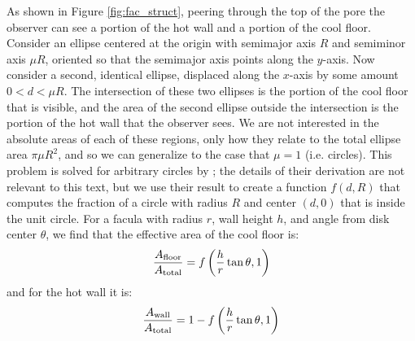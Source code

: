 \documentclass[linenumbers,5p,twocolumn,authoryear]{elsarticle}
\begin{document}
As shown in Figure \ref{fig:fac_struct}, peering through the top of the pore the observer can see a portion of the hot wall and a portion of the cool floor. Consider an ellipse centered at the origin with semimajor axis $R$ and semiminor axis $\mu R$, oriented so that the semimajor axis points along the $y$-axis. Now consider a second, identical ellipse, displaced along the $x$-axis by some amount $0<d<\mu R$. The intersection of these two ellipses is the portion of the cool floor that is visible, and the area of the second ellipse outside the intersection is the portion of the hot wall that the observer sees. We are not interested in the absolute areas of each of these regions, only how they relate to the total ellipse area $\pi \mu R^2$, and so we can generalize to the case that $\mu=1$ (i.e. circles). This problem is solved for arbitrary circles by \citet{weisstein2004}; the details of their derivation are not relevant to this text, but we use their result to create a function $f(d,R)$ that computes the fraction of a circle with radius $R$ and center $(d,0)$ that is inside the unit circle. For a facula with radius $r$, wall height $h$, and angle from disk center $\theta$, we find that the effective area of the cool floor is:
\begin{equation}
    \frac{A_{\rm floor}}{A_{\rm total}} = f\left(\frac{h}{r}\tan{\theta}, 1 \right)
\end{equation}
and for the hot wall it is:
\begin{equation}
    \frac{A_{\rm wall}}{A_{\rm total}} = 1-  f\left(\frac{h}{r}\tan{\theta}, 1 \right)
\end{equation}
\end{document}

